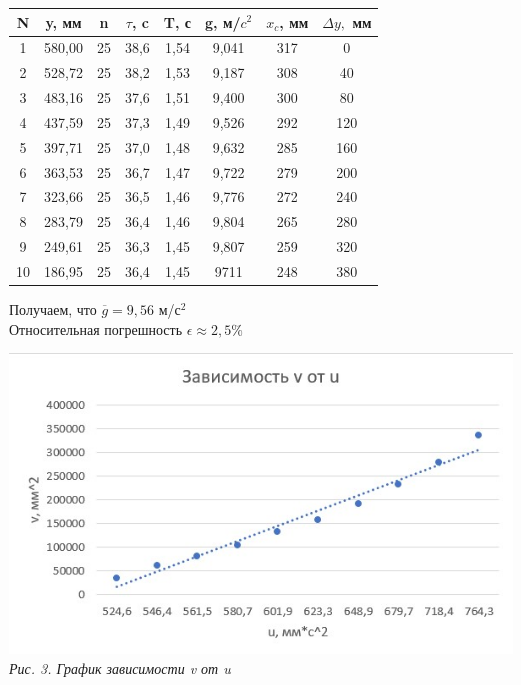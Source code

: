 \documentclass[12pt, a4paper]{article}
\begin{document}
        \begin{center}
            \begin{tabular}{ | c | c | c | c | c | c | c | c | }
                \hline
                N & y, мм & n & $\tau$, c & T, с & g, м/$c^2$ & $x_c$, мм & $\Delta y,$ мм \\ \hline
                1 & 580,00 & 25 & 38,6	& 1,54 & 9,041 & 317 & 0 \\ \hline
                2 & 528,72 & 25 & 38,2	& 1,53	& 9,187 & 308	& 40 \\ \hline
                3 & 483,16 & 25 & 37,6	& 1,51 	& 9,400 & 300	& 80 \\ \hline
                4 & 437,59 & 25 & 37,3  & 1,49	& 9,526 & 292	& 120 \\ \hline
                5 & 397,71 & 25 & 37,0  & 1,48	& 9,632 & 285	& 160 \\ \hline
                6 & 363,53 & 25 & 36,7	& 1,47  & 9,722 & 279 	& 200 \\ \hline
                7 & 323,66 & 25 & 36,5	& 1,46	& 9,776 & 272	& 240 \\ \hline
                8 & 283,79 & 25 & 36,4	& 1,46	& 9,804 & 265	& 280 \\ \hline
                9 & 249,61 & 25 & 36,3	& 1,45	& 9,807 & 259	& 320 \\ \hline
                10 & 186,95 & 25 & 36,4	& 1,45	& 9711  & 248	& 380 \\ \hline
            \end{tabular}
            \end{center} 
    
            Получаем, что $\overline{g} = 9,56$ м/$с^2$ \\
            Относительная погрешность $\epsilon \approx 2,5\%$ 
            
            \begin{minipage}[c]{\textwidth}
                \begin{center}
                    \includegraphics[scale=1]{Pics/picture3.jpg} \\
                    \textit{\textcolor[HTML]{000000}{Рис. 3. График зависимости v от u}}
                \end{center}
            \end{minipage}
\end{document}
